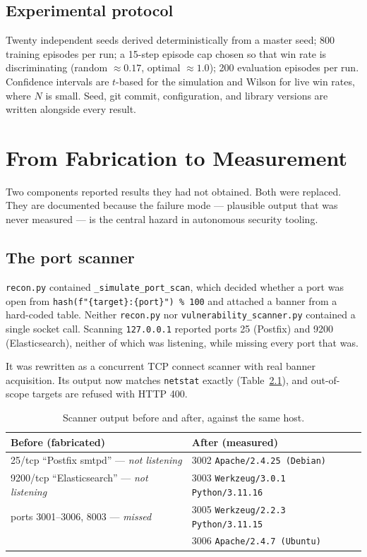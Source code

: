 \documentclass[11pt,a4paper]{report}
\newcommand{\code}[1]{\texttt{\small #1}}
\begin{document}
\section{Experimental protocol}
Twenty independent seeds derived deterministically from a master seed; 800
training episodes per run; a 15-step episode cap chosen so that win rate is
discriminating (random $\approx 0.17$, optimal $\approx 1.0$); 200 evaluation
episodes per run. Confidence intervals are $t$-based for the simulation and
Wilson for live win rates, where $N$ is small. Seed, git commit, configuration,
and library versions are written alongside every result.

\chapter{From Fabrication to Measurement}
\label{ch:honesty}

Two components reported results they had not obtained. Both were replaced. They
are documented because the failure mode --- plausible output that was never
measured --- is the central hazard in autonomous security tooling.

\section{The port scanner}
\code{recon.py} contained \code{\_simulate\_port\_scan}, which decided whether a
port was open from \code{hash(f"\{target\}:\{port\}") \% 100} and attached a
banner from a hard-coded table. Neither \code{recon.py} nor
\code{vulnerability\_scanner.py} contained a single socket call. Scanning
\code{127.0.0.1} reported ports 25 (Postfix) and 9200 (Elasticsearch), neither
of which was listening, while missing every port that was.

It was rewritten as a concurrent TCP connect scanner with real banner
acquisition. Its output now matches \code{netstat} exactly
(Table~\ref{tab:scan}), and out-of-scope targets are refused with HTTP 400.

\begin{table}[h]
\centering
\caption{Scanner output before and after, against the same host.}
\label{tab:scan}
\small
\begin{tabular}{ll}
\toprule
\textbf{Before (fabricated)} & \textbf{After (measured)}\\
\midrule
25/tcp ``Postfix smtpd'' --- \emph{not listening} & 3002 \code{Apache/2.4.25 (Debian)}\\
9200/tcp ``Elasticsearch'' --- \emph{not listening} & 3003 \code{Werkzeug/3.0.1 Python/3.11.16}\\
ports 3001--3006, 8003 --- \emph{missed} & 3005 \code{Werkzeug/2.2.3 Python/3.11.15}\\
 & 3006 \code{Apache/2.4.7 (Ubuntu)}\\
\bottomrule
\end{tabular}
\end{table}
\end{document}
